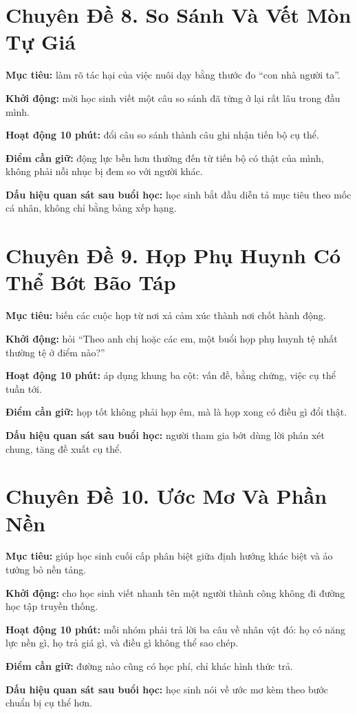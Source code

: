 \section*{Chuyên Đề 8. So Sánh Và Vết Mòn Tự Giá}

\begin{goigiaovien}
\textbf{Mục tiêu:} làm rõ tác hại của việc nuôi dạy bằng thước đo ``con nhà người ta''.

\textbf{Khởi động:} mời học sinh viết một câu so sánh đã từng ở lại rất lâu trong đầu mình.

\textbf{Hoạt động 10 phút:} đổi câu so sánh thành câu ghi nhận tiến bộ cụ thể.

\textbf{Điểm cần giữ:} động lực bền hơn thường đến từ tiến bộ có thật của mình, không phải nỗi nhục bị đem so với người khác.

\textbf{Dấu hiệu quan sát sau buổi học:} học sinh bắt đầu diễn tả mục tiêu theo mốc cá nhân, không chỉ bằng bảng xếp hạng.
\end{goigiaovien}

\section*{Chuyên Đề 9. Họp Phụ Huynh Có Thể Bớt Bão Táp}

\begin{goigiaovien}
\textbf{Mục tiêu:} biến các cuộc họp từ nơi xả cảm xúc thành nơi chốt hành động.

\textbf{Khởi động:} hỏi ``Theo anh chị hoặc các em, một buổi họp phụ huynh tệ nhất thường tệ ở điểm nào?''

\textbf{Hoạt động 10 phút:} áp dụng khung ba cột: vấn đề, bằng chứng, việc cụ thể tuần tới.

\textbf{Điểm cần giữ:} họp tốt không phải họp êm, mà là họp xong có điều gì đổi thật.

\textbf{Dấu hiệu quan sát sau buổi học:} người tham gia bớt dùng lời phán xét chung, tăng đề xuất cụ thể.
\end{goigiaovien}

\section*{Chuyên Đề 10. Ước Mơ Và Phần Nền}

\begin{goigiaovien}
\textbf{Mục tiêu:} giúp học sinh cuối cấp phân biệt giữa định hướng khác biệt và ảo tưởng bỏ nền tảng.

\textbf{Khởi động:} cho học sinh viết nhanh tên một người thành công không đi đường học tập truyền thống.

\textbf{Hoạt động 10 phút:} mỗi nhóm phải trả lời ba câu về nhân vật đó: họ có năng lực nền gì, họ trả giá gì, và điều gì không thể sao chép.

\textbf{Điểm cần giữ:} đường nào cũng có học phí, chỉ khác hình thức trả.

\textbf{Dấu hiệu quan sát sau buổi học:} học sinh nói về ước mơ kèm theo bước chuẩn bị cụ thể hơn.
\end{goigiaovien}

